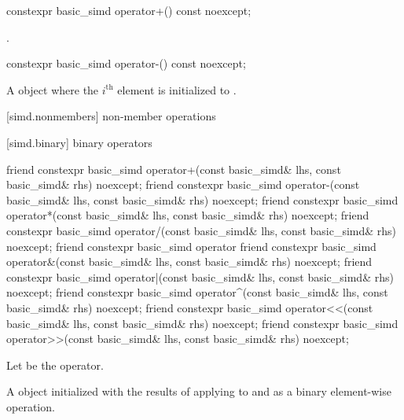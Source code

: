 \begin{itemdecl}
constexpr basic_simd operator+() const noexcept;
\end{itemdecl}

\begin{itemdescr}
  \pnum{}

  \pnum\returns
  .
\end{itemdescr}

\begin{itemdecl}
constexpr basic_simd operator-() const noexcept;
\end{itemdecl}

\begin{itemdescr}
  \pnum{}

  \pnum\returns
  A  object where the $i^\text{th}$ element is initialized to
   \foralli.
\end{itemdescr}

[simd.nonmembers]{ non-member operations}

[simd.binary]{ binary operators}

\begin{itemdecl}
friend constexpr basic_simd operator+(const basic_simd& lhs, const basic_simd& rhs) noexcept;
friend constexpr basic_simd operator-(const basic_simd& lhs, const basic_simd& rhs) noexcept;
friend constexpr basic_simd operator*(const basic_simd& lhs, const basic_simd& rhs) noexcept;
friend constexpr basic_simd operator/(const basic_simd& lhs, const basic_simd& rhs) noexcept;
friend constexpr basic_simd operator%
friend constexpr basic_simd operator&(const basic_simd& lhs, const basic_simd& rhs) noexcept;
friend constexpr basic_simd operator|(const basic_simd& lhs, const basic_simd& rhs) noexcept;
friend constexpr basic_simd operator^(const basic_simd& lhs, const basic_simd& rhs) noexcept;
friend constexpr basic_simd operator<<(const basic_simd& lhs, const basic_simd& rhs) noexcept;
friend constexpr basic_simd operator>>(const basic_simd& lhs, const basic_simd& rhs) noexcept;
\end{itemdecl}

\begin{itemdescr}
  \pnum Let \op{} be the operator.

  \pnum\ConstraintOperatorTWellFormed

  \pnum\returns
  A  object initialized with the results of applying \op{} to  and
   as a binary element-wise operation.
\end{itemdescr}

